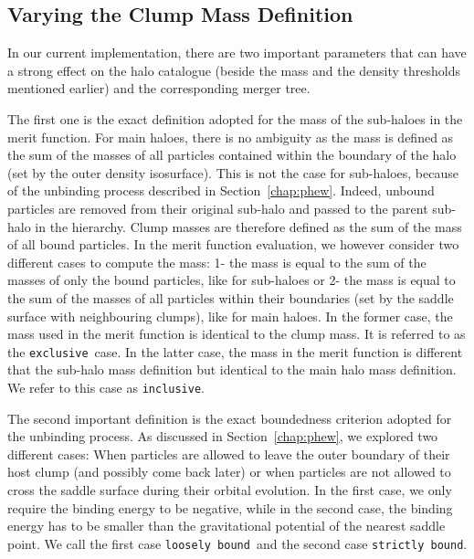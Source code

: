\documentclass[a4paper,twocolumn,fleqn,usenatbib]{mnras}
\newcommand{\exc}{\texttt{exclusive}}
\newcommand{\inc}{\texttt{inclusive}}
\newcommand{\sad}{\texttt{strictly bound}}
\newcommand{\nosad}{\texttt{loosely bound}}
\providecommand{\DIFaddbegin}{} %
\providecommand{\DIFaddend}{} %
\providecommand{\DIFdelend}{} %
\newcommand{\DIFaddincludegraphics}[2][]{{\color{blue}\fbox{\DIFOincludegraphics[#1]{#2}}}} %
\DeclareRobustCommand{\DIFaddbegin}{\DIFOaddbegin \let\includegraphics\DIFaddincludegraphics} %
\DeclareRobustCommand{\DIFaddend}{\DIFOaddend \let\includegraphics\DIFOincludegraphics} %
\DeclareRobustCommand{\DIFdelend}{\DIFOaddend \let\includegraphics\DIFOincludegraphics} %
\begin{document}
\DIFdelend %
\subsection{Varying the Clump Mass Definition}%
\DIFaddbegin \label{chap:varying_clump_mass_definition}
\DIFaddend 

In our current implementation, there are two important parameters that
can have a strong effect on the halo catalogue (beside the mass and
the density thresholds mentioned earlier) and the corresponding merger
tree.

The first one is the exact definition adopted for the mass of the
sub-haloes in the merit function.  For main haloes, there is no
ambiguity as the mass is defined as the sum of the masses of all
particles contained within the boundary of the halo (set by the outer
density isosurface). This is not the case for sub-haloes, because of the
unbinding process described in Section~\ref{chap:phew}. Indeed,
unbound particles are removed from their original sub-halo and passed
to the parent sub-halo in the hierarchy.  Clump masses are therefore
defined as the sum of the mass of all bound particles.  In the merit
function evaluation, we however consider two different cases to
compute the mass: 1- the mass is equal to the sum of the masses of
only the bound particles, like for sub-haloes or 2- the mass is equal
to the sum of the masses of all particles within their boundaries (set
by the saddle surface with neighbouring clumps), like for main haloes.
In the former case, the mass used in the merit function is identical
to the clump mass. It is referred to as the \exc\ case.  In the latter
case, the mass in the merit function is different that the sub-halo
mass definition but identical to the main halo mass definition.  We
refer to this case as \inc.

The second important definition is the exact boundedness criterion
adopted for the unbinding process.  As discussed in
Section~\ref{chap:phew}, we explored two different cases: When
particles are allowed to leave the outer boundary of their host clump
(and possibly come back later) or when particles are not allowed to
cross the saddle surface during their orbital evolution. In the first
case, we only require the binding energy to be negative, while in the
second case, the binding energy has to be smaller than the
gravitational potential of the nearest saddle point.  We call the
first case \nosad\ and the second case \sad.
\end{document}
